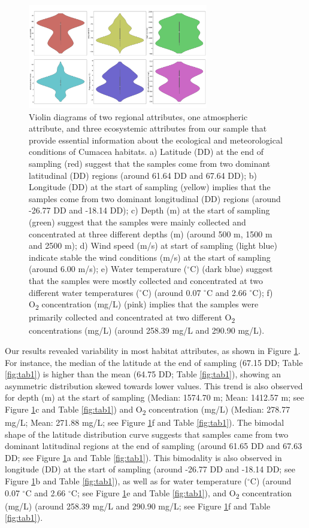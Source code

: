 {\begin{figure}[htbp]
    \centering
    \includegraphics[width=0.7\textwidth]{figure1.jpg}
    \caption{Violin diagrams of two regional attributes, one atmospheric attribute, and three ecosystemic attributes from our sample that provide essential information about the ecological and meteorological conditions of Cumacea habitats. a) Latitude (DD) at the end of sampling (red) suggest that the samples come from two dominant latitudinal (DD) regions (around 61.64 DD and 67.64 DD); b) Longitude (DD) at the start of sampling (yellow) implies that the samples come from two dominant longitudinal (DD) regions (around -26.77 DD and -18.14 DD); c) Depth (m) at the start of sampling (green) suggest that the samples were mainly collected and concentrated at three different depths (m) (around 500 m, 1500 m and 2500 m); d) Wind speed (m/s) at start of sampling (light blue) indicate stable the wind conditions (m/s) at the start of sampling (around 6.00 m/s); e) Water temperature ($^\circ$C) (dark blue) suggest that the samples were mostly collected and concentrated at two different water temperatures ($^\circ$C) (around 0.07 $^\circ$C and 2.66 $^\circ$C); f) O\textsubscript{2} concentration (mg/L) (pink) implies that the samples were primarily collected and concentrated at two different O\textsubscript{2} concentrations (mg/L) (around 258.39 mg/L and 290.90 mg/L). \label{fig:fig2}}
\end{figure}

Our results revealed variability in most habitat attributes, as shown in Figure \ref{fig:fig2}. For instance, the median of the latitude at the end of sampling (67.15 DD; Table \ref{fig:tab1}) is higher than the mean (64.75 DD; Table \ref{fig:tab1}), showing an asymmetric distribution skewed towards lower values. This trend is also observed for depth (m) at the start of sampling (Median: 1574.70 m; Mean: 1412.57 m; see Figure \ref{fig:fig2}c and Table \ref{fig:tab1}) and O\textsubscript{2} concentration (mg/L) (Median: 278.77 mg/L; Mean: 271.88 mg/L; see Figure \ref{fig:fig2}f and Table \ref{fig:tab1}). The bimodal shape of the latitude distribution curve suggests that samples came from two dominant latitudinal regions at the end of sampling (around 61.65 DD and 67.63 DD; see Figure \ref{fig:fig2}a and Table \ref{fig:tab1}). This bimodality is also observed in longitude (DD) at the start of sampling (around -26.77 DD and -18.14 DD; see Figure \ref{fig:fig2}b and Table \ref{fig:tab1}), as well as for water temperature ($^\circ$C) (around 0.07 $^\circ$C and 2.66 $^\circ$C; see Figure \ref{fig:fig2}e and Table \ref{fig:tab1}), and O\textsubscript{2} concentration (mg/L) (around 258.39 mg/L and 290.90 mg/L; see Figure \ref{fig:fig2}f and Table \ref{fig:tab1}).

}
